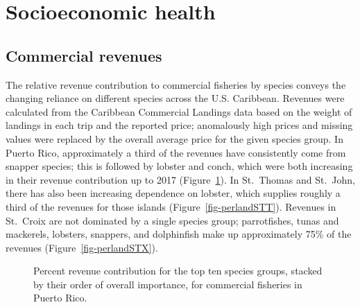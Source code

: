 \documentclass[
  letterpaper,
  oneside,
  open=any]{scrbook}
\begin{document}
\section{Socioeconomic health}\label{socioeconomic-health}

\subsection{Commercial revenues}\label{commercial-revenues}

The relative revenue contribution to commercial fisheries by species
conveys the changing reliance on different species across the U.S.
Caribbean. Revenues were calculated from the Caribbean Commercial
Landings data based on the weight of landings in each trip and the
reported price; anomalously high prices and missing values were replaced
by the overall average price for the given species group. In Puerto
Rico, approximately a third of the revenues have consistently come from
snapper species; this is followed by lobster and conch, which were both
increasing in their revenue contribution up to 2017
(Figure~\ref{fig-perlandPR}). In St.~Thomas and St.~John, there has also
been increasing dependence on lobster, which supplies roughly a third of
the revenues for those islands (Figure~\ref{fig-perlandSTT}). Revenues
in St.~Croix are not dominated by a single species group; parrotfishes,
tunas and mackerels, lobsters, snappers, and dolphinfish make up
approximately 75\% of the revenues (Figure~\ref{fig-perlandSTX}).

\begin{figure}


\caption{\label{fig-perlandPR}Percent revenue contribution for the top
ten species groups, stacked by their order of overall importance, for
commercial fisheries in Puerto Rico.}

\end{figure}%
\end{document}

